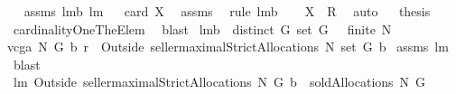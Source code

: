 \begin{isabellebody}
\isadelimproof
\ %
\endisadelimproof
%
\isatagproof
{}\isamarkupfalse%
\ assms\ lm{}{}b\ lm{}{}\isanewline
{}\isamarkupfalse%
\ {\isacharminus}\isanewline
{}\isamarkupfalse%
\ {\isachardoublequoteopen}card\ {\isacharquery}X{\isacharequal}{}{\isachardoublequoteclose}\ \isamarkupfalse%
\ assms\ \isamarkupfalse%
\ {\isacharparenleft}rule\ lm{}{}b{\isacharparenright}\ \isamarkupfalse%
\ \isamarkupfalse%
\ {\isachardoublequoteopen}{\isacharquery}X\ {\isasymsubseteq}\ {\isacharquery}R{\isachardoublequoteclose}\ \isamarkupfalse%
\ auto\isanewline
{}\isamarkupfalse%
\ \isamarkupfalse%
\ {\isacharquery}thesis\ \isamarkupfalse%
\ cardinalityOneTheElem\ \isamarkupfalse%
\ blast\isanewline
{}\isamarkupfalse%
%
\endisatagproof
{\isafoldproof}%
%
\isadelimproof
%
\endisadelimproof
\isanewline
\isanewline
{}\isamarkupfalse%
\ lm{}{}b{\isacharcolon}\ \ {\isachardoublequoteopen}distinct\ G{\isachardoublequoteclose}\ {\isachardoublequoteopen}set\ G\ {\isasymnoteq}\ {\isacharbraceleft}{\isacharbraceright}{\isachardoublequoteclose}\ {\isachardoublequoteopen}finite\ N{\isachardoublequoteclose}\ \ \isanewline
{\isachardoublequoteopen}vcga{\isacharprime}\ N\ G\ b\ r\ {\isasymin}\ {\isacharparenleft}Outside{\isacharprime}\ {\isacharbraceleft}seller{\isacharbraceright}{\isacharparenright}{\isacharbackquote}{\isacharparenleft}maximalStrictAllocations{\isacharprime}\ N\ {\isacharparenleft}set\ G{\isacharparenright}\ b{\isacharparenright}{\isachardoublequoteclose}\isanewline
%
\isadelimproof
%
\endisadelimproof
%
\isatagproof
{}\isamarkupfalse%
\ assms\ lm{}{}\ \isamarkupfalse%
\ blast%
\endisatagproof
{\isafoldproof}%
%
\isadelimproof
\isanewline
%
\endisadelimproof
\isanewline
{}\isamarkupfalse%
\ lm{}{}{\isacharcolon}\ {\isachardoublequoteopen}{\isacharparenleft}Outside{\isacharprime}\ {\isacharbraceleft}seller{\isacharbraceright}{\isacharparenright}{\isacharbackquote}{\isacharparenleft}maximalStrictAllocations{\isacharprime}\ N\ G\ b{\isacharparenright}\ {\isasymsubseteq}\ soldAllocations\ N\ G{\isachardoublequoteclose}\isanewline
%
\isadelimproof
%
\endisadelimproof
%
\isatagproof
{}\isamarkupfalse%

\end{isabellebody}
